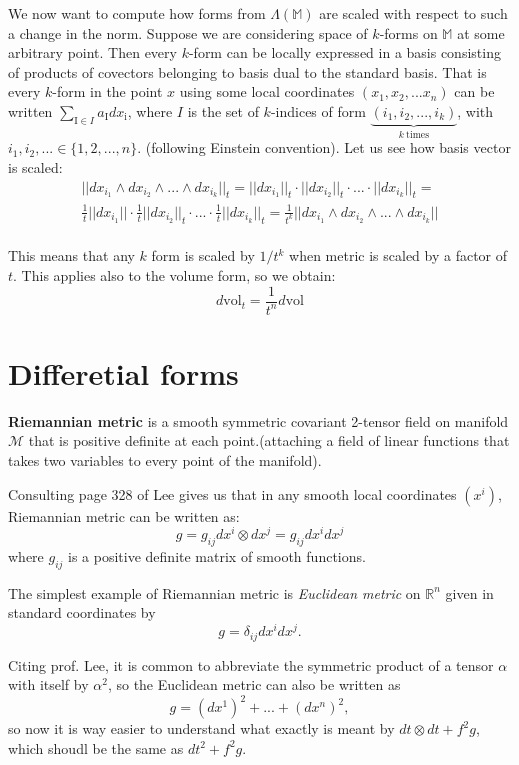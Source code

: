 \documentclass[licencjacka]{pracamgr}
\theoremstyle{definition}
\theoremstyle{remark}
\begin{document}
We now want to compute how forms from $\Lambda(\mathbb{M})$ are scaled
with respect to such a change in the norm. Suppose we are considering
space of $k$-forms on $\mathbb{M}$ at some arbitrary point. Then every
$k$-form can be locally expressed in a basis consisting of products of
covectors belonging to basis dual to the standard basis. That is every
$k$-form in the point $x$ using some local coordinates $(x_1, x_2,
... x_n)$ can be written $ \sum_{\mathrm{I} \in I } a_\mathrm{I}
dx_\mathrm{i}$, where $I$ is the set of $k$-indices of form
$\underbrace{(i_1, i_2, ..., i_k)}_{k~\mathrm{times}}$, with $i_1,
i_2, ... \in \{1, 2, ..., n \}$.  (following Einstein convention).
Let us see how basis vector is scaled:
\begin{multline*}
    ||dx_{i_1} \wedge dx_{i_2} \wedge ... \wedge dx_{i_k} ||_t =  
    ||dx_{i_1} ||_t \cdot ||  dx_{i_2} ||_t \cdot ... \cdot || dx_{i_k} ||_t =  \\
    \frac{1}{t}||dx_{i_1} || \cdot \frac{1}{t} ||  dx_{i_2} ||_t \cdot ...
     \cdot \frac{1}{t} || dx_{i_k} ||_t = 
    \frac{1}{t^k}||dx_{i_1} \wedge dx_{i_2} \wedge ... \wedge dx_{i_k} ||
\end{multline*} \\

This means that any $k$ form is scaled by $1/t^k$ when metric is scaled
by a factor of $t$.
This applies also to the volume form, so we obtain:
\[
d\mathrm{vol}_t = \frac{1}{t^n} d\mathrm{vol}
\]

\section{Differetial forms}

\textbf{Riemannian metric} is a smooth symmetric covariant 2-tensor field
on manifold $\mathcal{M}$ that is positive definite at each point.(attaching
a field of linear functions that takes two variables to every point of the
manifold).

Consulting page 328 of Lee gives us that in any smooth local coordinates
$(x^i)$, Riemannian metric can be written as:
\[
    g = g_{ij} dx^i \otimes dx^j = g_{ij} dx^i dx^j
\]
where $g_{ij}$ is a positive definite matrix of smooth functions. 

The simplest example of Riemannian metric is \emph{Euclidean metric} on
$\mathbb{R}^n$ given in standard coordinates by 
\[
    g = \delta_{ij}dx^idx^j.
\]

Citing prof. Lee, it is common to abbreviate the symmetric product of a tensor
$\alpha$ with itself by $\alpha^2$, so the Euclidean metric can also be written
as 
\[
    g = (dx^1)^2 + ...  + (dx^n)^2,
\]
so now it is way easier to understand what exactly is meant by
$ dt \otimes dt + f^2g $, which shoudl be the same as $dt^2 + f^2g$. \\
\end{document}
